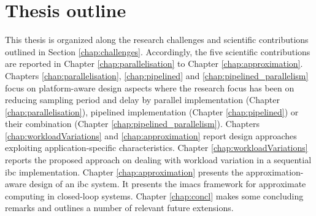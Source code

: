 














\section{Thesis outline}
This thesis is organized along the research challenges and scientific contributions outlined in Section \ref{chap:challenges}. Accordingly, the five scientific contributions are reported in Chapter \ref{chap:parallelisation} to Chapter \ref{chap:approximation}. 
Chapters \ref{chap:parallelisation}, \ref{chap:pipelined} and \ref{chap:pipelined_parallelism} focus on platform-aware design aspects where the research focus has been on reducing sampling period and delay by parallel implementation (Chapter \ref{chap:parallelisation}), pipelined implementation (Chapter \ref{chap:pipelined}) or their combination (Chapter \ref{chap:pipelined_parallelism}). Chapters \ref{chap:workloadVariations} and  \ref{chap:approximation} report design approaches exploiting application-specific characteristics. Chapter \ref{chap:workloadVariations} reports the proposed approach on dealing with workload variation in a sequential \gls{ibc} implementation. Chapter \ref{chap:approximation} presents the approximation-aware design of an \gls{ibc} system. It presents the \gls{imacs} framework for approximate computing in closed-loop systems. Chapter \ref{chap:concl} makes some concluding remarks and outlines a number of relevant future extensions. 

\vfill
